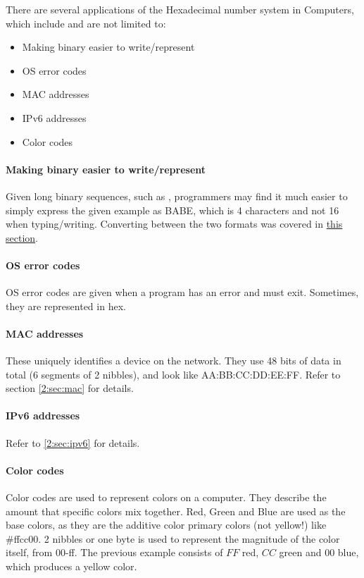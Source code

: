 \documentclass[../main.tex]{subfiles}
\begin{document}
There are several applications of the Hexadecimal number system in Computers, which include and are not limited to:

\begin{itemize}
    \item Making binary easier to write/represent
    \item OS error codes
    \item MAC addresses
    \item IPv6 addresses
    \item Color codes
\end{itemize}

\paragraph{Making binary easier to write/represent}

Given long binary sequences, such as {}, programmers may find it much easier to simply express the given example as {\ccmono BABE}, which is 4 characters and not 16 when typing/writing. Converting between the two formats was covered in \hyperref[sec:1-converting-between-bin-den-and-hexadecimal]{this section}.

\paragraph{OS error codes}

OS error codes are given when a program has an error and must exit. Sometimes, they are represented in hex.

\paragraph{MAC addresses}

These uniquely identifies a device on the network. They use 48 bits of data in total (6 segments of 2 nibbles), and look like {\ccmono AA:BB:CC:DD:EE:FF}. Refer to section \ref{2:sec:mac} for details.

\paragraph{IPv6 addresses}

Refer to \ref{2:sec:ipv6} for details.

\paragraph{Color codes}

Color codes are used to represent colors on a computer. They describe the amount that specific colors mix together. Red, Green and Blue are used as the base colors, as they are the additive color primary colors (not yellow!) like {\ccmono \#ffcc00}. 2 nibbles or one byte is used to represent the magnitude of the color itself, from 00-ff. The previous example consists of $FF$ red, $CC$ green and $00$ blue, which produces a yellow color.
\end{document}

